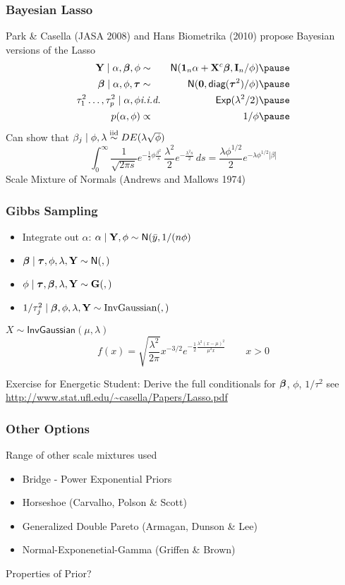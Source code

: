 \documentclass[]{beamer}
\begin{document}
\begin{frame}
  \frametitle{Bayesian Lasso}
  Park \& Casella (JASA 2008) and Hans Biometrika (2010) propose
  Bayesian versions of the Lasso  \pause
  \begin{eqnarray*}
    \Y \mid \alpha, \b, \phi & \sim & \N(\one_n \alpha + \X^c \b, \I_n/\phi)  \pause\\
    \b \mid \alpha, \phi, \taub & \sim & \N(\zero, \diag(\taub^2)/\phi)  \pause\\
    \tau_1^2 \ldots, \tau_p^2 \mid \alpha, \phi & \iid & \Ex(\lambda^2/2)  \pause\\
    p(\alpha, \phi) & \propto& 1/\phi  \pause\\
  \end{eqnarray*}
Can show that $\beta_j \mid \phi, \lambda \mathrel{\mathop{\sim}\limits^{\rm iid}} DE(\lambda \sqrt{\phi})$
$$\int_0^\infty \frac{1}{\sqrt{2 \pi s}}
  e^{-\frac{1}{2} \phi \frac{\beta^2}{s }}
  \, \frac{\lambda^2}{2} e^{- \frac{\lambda^2 s}{2}}\, ds =
  \frac{\lambda \phi^{1/2}}{2} e^{-\lambda \phi^{1/2} |\beta|}
$$  \pause
Scale Mixture of Normals  (Andrews and Mallows 1974)
\end{frame}
\begin{frame}
  \frametitle{Gibbs Sampling}
  \begin{itemize}
  \item Integrate out $\alpha$: $\alpha \mid \mathbf{Y}, \phi \sim \textsf{N}(\bar{y},
    1/(n \phi)$  \pause
\item $\boldsymbol{\beta} \mid \boldsymbol{\tau}, \phi, \lambda, \mathbf{Y} \sim \textsf{N}(, )$   \pause
\item $\phi \mid \boldsymbol{\tau}, \boldsymbol{\beta}, \lambda, \mathbf{Y} \sim \mathbf{G}( , ) $  \pause
\item $1/\tau_j^2 \mid \boldsymbol{\beta}, \phi, \lambda, \mathbf{Y} \sim \text{InvGaussian}(
  , )$  \pause
  \end{itemize}
$X \sim \textsf{InvGaussian}(\mu,  \lambda)$
$$
f(x) =  \sqrt{\frac{\lambda^2}{2 \pi}}  x^{-3/2} e^{- \frac{1}{2} \frac{
    \lambda^2( x - \mu)^2} {\mu^2 x}} \qquad x > 0
$$  \pause

Exercise for Energetic Student:  Derive the full conditionals for $\boldsymbol{\beta}$, $\phi$,
$1/\tau^2$  see \url{http://www.stat.ufl.edu/~casella/Papers/Lasso.pdf} 
\end{frame}
\begin{frame}
  \frametitle{Other Options}
  Range of other scale mixtures used  \pause
  \begin{itemize}
  \item Bridge - Power Exponential Priors  \pause
  \item Horseshoe  (Carvalho, Polson \& Scott)  \pause
  \item Generalized Double Pareto (Armagan, Dunson \& Lee)  \pause
  \item Normal-Exponenetial-Gamma (Griffen \& Brown)  \pause
   \end{itemize}
Properties of Prior?   \pause
\end{frame}
\end{document}
